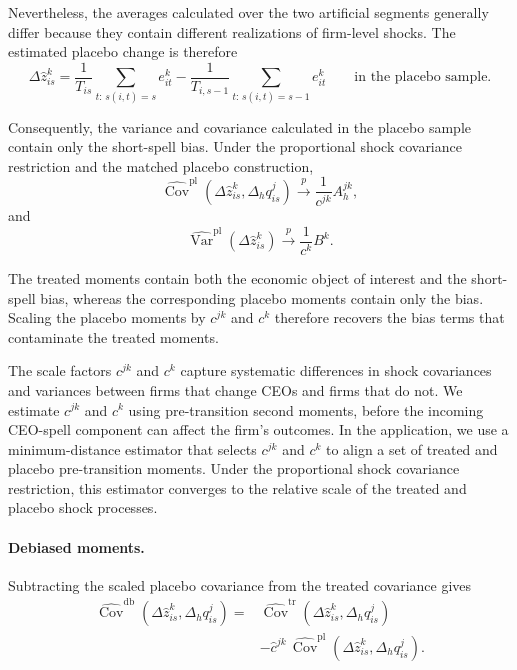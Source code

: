 \documentclass[11pt,a4paper]{article}
\begin{document}
Nevertheless, the averages calculated over the two artificial segments
generally differ because they contain different realizations of
firm-level shocks. The estimated placebo change is therefore
\begin{equation}
\Delta\widehat z_{is}^{k}
=
\frac{1}{T_{is}}
\sum_{t:\,s(i,t)=s}
e_{it}^{k}
-
\frac{1}{T_{i,s-1}}
\sum_{t:\,s(i,t)=s-1}
e_{it}^{k}
\qquad
\text{in the placebo sample}.
\label{eq:placebo_estimated_change}
\end{equation}

Consequently, the variance and covariance calculated in the placebo
sample contain only the short-spell bias. Under the proportional shock covariance restriction and the matched
placebo construction,
\begin{equation}
\widehat{\operatorname{Cov}}^{\mathrm{pl}}\!\left(
\Delta\widehat z_{is}^{k},
\Delta_h q_{is}^{j}
\right)
\overset{p}{\longrightarrow}
\frac{1}{c^{jk}}A_h^{jk},
\label{eq:placebo_covariance}
\end{equation}
and
\begin{equation}
\widehat{\operatorname{Var}}^{\mathrm{pl}}\!\left(
\Delta\widehat z_{is}^{k}
\right)
\overset{p}{\longrightarrow}
\frac{1}{c^{k}}B^k.
\label{eq:placebo_variance}
\end{equation}

The treated moments contain both the economic object of interest and
the short-spell bias, whereas the corresponding placebo moments
contain only the bias. Scaling the placebo moments by $c^{jk}$ and $c^{k}$ therefore
recovers the bias terms that contaminate the treated moments.

The scale factors $c^{jk}$ and $c^k$ capture systematic differences in
shock covariances and variances between firms that change CEOs and firms that do not. We
estimate $c^{jk}$ and $c^{k}$ using pre-transition second moments, before the incoming
CEO-spell component can affect the firm's outcomes. In the application,
we use a minimum-distance estimator that selects $c^{jk}$ and $c^{k}$ to align a set of
treated and placebo pre-transition moments. Under the proportional
shock covariance restriction, this estimator converges to the relative
scale of the treated and placebo shock processes.

\paragraph{Debiased moments.}
Subtracting the scaled placebo covariance from the treated covariance
gives
\begin{align}
\widehat{\operatorname{Cov}}^{\mathrm{db}}\!\left(
\Delta\widehat z_{is}^{k},
\Delta_h q_{is}^{j}
\right)
={}&
\widehat{\operatorname{Cov}}^{\mathrm{tr}}\!\left(
\Delta\widehat z_{is}^{k},
\Delta_h q_{is}^{j}
\right)
\nonumber\\
&-
\widehat c^{jk}\,
\widehat{\operatorname{Cov}}^{\mathrm{pl}}\!\left(
\Delta\widehat z_{is}^{k},
\Delta_h q_{is}^{j}
\right).
\label{eq:debiased_covariance}
\end{align}
\end{document}

